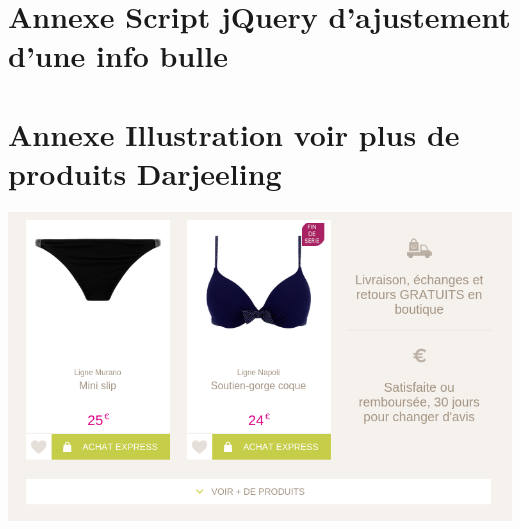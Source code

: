 \documentclass[a4paper,11pt,twoside]{report}
\begin{document}
    \newpage
  
  \section*{Annexe Script jQuery d'ajustement d'une info bulle}
  \label{script_jQuery_d_ajustement_d_une_info_bulle}
  
  
  \newpage
  
  \section*{Annexe Illustration voir plus de produits Darjeeling}
  \begin{center}
      \includegraphics[width=\textwidth]{images/darjeeling_see_more_products.png} 
      \label{darjeeling_see_more_products}
  \end{center}
  
  \newpage
  
\end{document}

